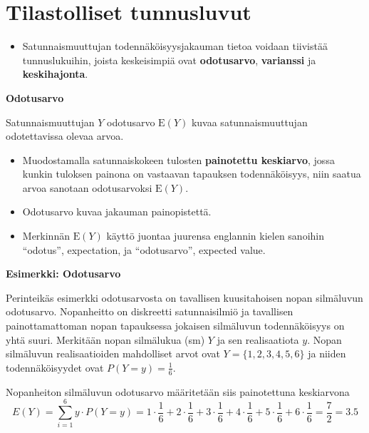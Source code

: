 \documentclass[
]{book}
\providecommand{\tightlist}{%
  \setlength{\itemsep}{0pt}\setlength{\parskip}{0pt}}
\begin{document}
\hypertarget{alaluku44}{%
\section{Tilastolliset tunnusluvut}\label{alaluku44}}

\begin{itemize}
\tightlist
\item
  Satunnaismuuttujan todennäköisyysjakauman tietoa voidaan tiivistää tunnuslukuihin, joista keskeisimpiä ovat \textbf{odotusarvo}, \textbf{varianssi} ja \textbf{keskihajonta}.
\end{itemize}

\begin{defblock}{}

\textbf{Odotusarvo}

Satunnaismuuttujan \(Y\) odotusarvo \(\text{E}(Y)\) kuvaa satunnaismuuttujan odotettavissa olevaa arvoa.

\begin{itemize}
\tightlist
\item
  Muodostamalla satunnaiskokeen tulosten \textbf{painotettu keskiarvo}, jossa kunkin tuloksen painona on vastaavan tapauksen todennäköisyys, niin saatua arvoa sanotaan odotusarvoksi \(\text{E}(Y)\).
\item
  Odotusarvo kuvaa jakauman painopistettä.
\item
  Merkinnän \(\text{E}(Y)\) käyttö juontaa juurensa englannin kielen sanoihin ``odotus'', expectation, ja ``odotusarvo'', expected value.
\end{itemize}

\end{defblock}

\begin{eblock}{}
\textbf{Esimerkki: Odotusarvo}

Perinteikäs esimerkki odotusarvosta on tavallisen kuusitahoisen nopan silmäluvun odotusarvo. Nopanheitto on diskreetti satunnaisilmiö ja tavallisen painottamattoman nopan tapauksessa jokaisen silmäluvun todennäköisyys on yhtä suuri. Merkitään nopan silmälukua (sm) \(Y\) ja sen realisaatiota \(y\). Nopan silmäluvun realisaatioiden mahdolliset arvot ovat \(Y = \{1,2,3,4,5,6\}\) ja niiden todennäköisyydet ovat \(P(Y=y) = \frac{1}{6}\).

Nopanheiton silmäluvun odotusarvo määritetään siis painotettuna keskiarvona \[E(Y) = \sum_{i=1}^6 y \cdot P(Y=y)  = 1 \cdot \frac{1}{6} + 2 \cdot \frac{1}{6} + 3 \cdot \frac{1}{6} + 4 \cdot \frac{1}{6} + 5 \cdot \frac{1}{6} + 6 \cdot \frac{1}{6} = \frac{7}{2} = 3.5\]

\end{eblock}
\end{document}
